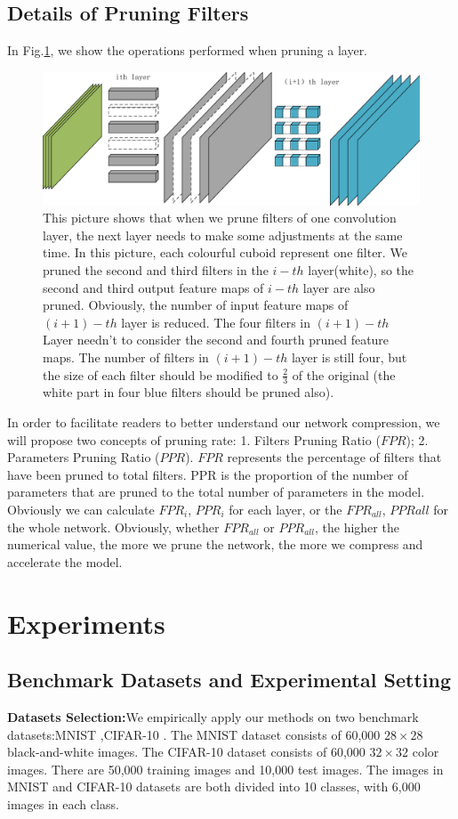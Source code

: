 \documentclass[runningheads]{llncs}
\begin{document}
\subsection{Details of Pruning Filters}

In Fig.\ref{fig:filters_pruning}, we show the operations performed when pruning a layer.

\begin{figure}
\centering
\includegraphics[width=.5\textwidth]{filters_pruning.pdf}
\caption{This picture shows that when we prune filters of one convolution layer, the next layer needs to make some adjustments at the same time. In this picture, each colourful cuboid represent one filter. We pruned the second and third filters in the $i-th$ layer(white), so the second and third output feature maps of $i-th$ layer are also pruned. Obviously, the number of input feature maps of $(i+1)-th$ layer is reduced. The four filters in $(i+1)-th$ Layer needn't to consider the second and fourth pruned feature maps. The number of filters in $(i+1)-th$ layer is still four, but the size of each filter should be modified to $\frac{2}{3}$ of the original (the white part in four blue filters should be pruned also).}
\label{fig:filters_pruning}
\end{figure}


In order to facilitate readers to better understand our network compression, we will propose two concepts of pruning rate: 1. Filters Pruning Ratio ($FPR$); 2. Parameters Pruning Ratio ($PPR$). $FPR$ represents the percentage of filters that have been pruned to total filters. PPR is the proportion of the number of parameters that are pruned to the total number of parameters in the model. Obviously we can calculate $FPR_i$, $PPR_i$ for each layer, or the $FPR_{all}$, $PPR{all}$ for the whole network.
Obviously, whether $FPR_{all}$ or $PPR_{all}$, the higher the numerical value, the more we prune the network, the more we compress and accelerate the model.


\section{Experiments}

\subsection{Benchmark Datasets and Experimental Setting}
\textbf{Datasets Selection:}We empirically apply our methods on two benchmark datasets:MNIST \cite{b24} ,CIFAR-10 \cite{b25}. The MNIST dataset consists of 60,000 $28\times28$ black-and-white images. The CIFAR-10 dataset consists of 60,000 $32\times32$ color images. There are 50,000 training images and 10,000 test images. The images in MNIST and CIFAR-10 datasets are both divided into 10 classes, with 6,000 images in each class.
\end{document}
